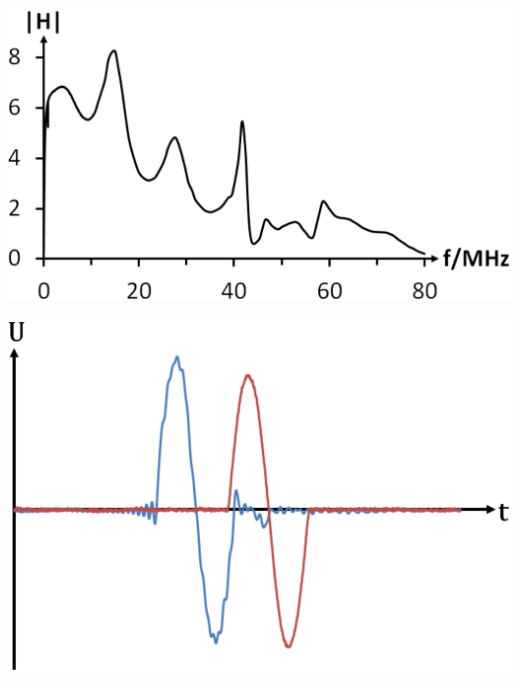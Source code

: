 \documentclass[paper=a0,accentcolor=tud9b,colorbacktitle,colorbacksubtitle]{tudposter}
\begin{document}
\begin{multicols}{2}
	 \begin{minipage}{0.24\textwidth}
	 \begin{center}
	  \includegraphics[scale=0.9]{WEPVA047f3_2.eps}
	  \label{H_ESR}
	 \end{center}
	\end{minipage}
	\begin{minipage}{0.01\textwidth}
	 \hspace{1cm}
	\end{minipage}
	\begin{minipage}{0.22\textwidth}
	\begin{center}
	 \includegraphics[scale=0.8]{U_BB_KWT2017_2.eps}
	  \label{Signal}
	\end{center}
	 \end{minipage}
	 

\end{multicols}
\end{document}
